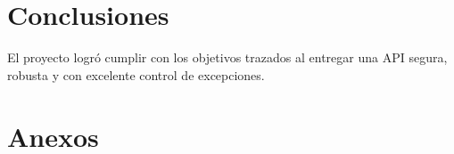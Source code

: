 \documentclass[12pt, a4paper]{article}
\begin{document}
\section{Conclusiones}
El proyecto logró cumplir con los objetivos trazados al entregar una API segura, robusta y con excelente control de excepciones.

\section{Anexos}
\end{document}

